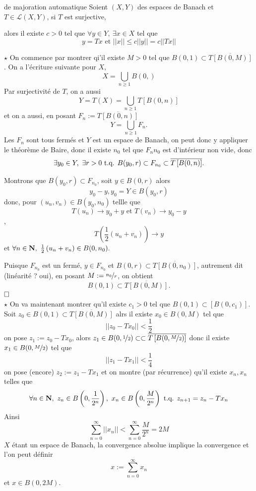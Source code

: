 \documentclass[a4paper,11pt, twoside]{article}
\begin{document}
\begin{thC}{de majoration automatique}
  Soient $(X,Y)$ des espaces de Banach et $T\in\mathcal L(X,Y)$, si $T$ est surjective,

  alors il existe $c>0$ tel que $\forall y\in Y,\ \exists x\in X$ tel que
  $$y=Tx\text{ et }||x||\leqslant c||y||=c||Tx||$$
\end{thC}


\begin{Proof}
  $\star$ On commence par montrer qi'il existe $M>0$ tel que $B(0,1)\subset \overline{T\left[B(0,M)\right]}$. On a l'écriture suivante pour $X$,
  $$X=\bigcup_{n\geqslant 1}B(0,)$$
  Par surjectivité de $T$, on a aussi
  $$Y=T(X)=\bigcup_{n\geqslant 1}T\left[B(0,n)\right]$$
  et on a aussi, en posant $F_n:=\overline{T\left[B(0,n)\right]}$
  $$Y=\bigcup_{n\geqslant 1}F_n.$$
  Les $F_n$ sont tous fermés et $Y$ est un espace de Banach, on peut donc y appliquer le théorème de Baire, donc il existe $n_0$ tel que $F_n{n_0}$ est d'intérieur non vide, donc
  $$\exists y_0\in Y,\ \exists r>0\text{ t.q. } B(y_0,r)\subset F_{n_0}\subset \overline{T\left[B(0,n)\right]}.$$

  Montrons que $B(y_0,r)\subset F_{n_0}$, soit $y\in B(0,r)$ alors 
  $$y_0-y,y_0=Y\in B(y_0,r)$$
  donc, pour $(u_n,v_n)\in B(y_0,n_0)$ tellle que 
  $$T(u_n)\longrightarrow y_0+y\text{ et }T(v_n)\longrightarrow y_0-y$$,
  $$T\left(\frac12\left(u_n+v_n\right)\right)\longrightarrow y$$
  et $\forall n\in\N,\ \frac12\left(u_n+v_n\right)\in B(0,n_0).$

  Puisque $F_{n_0}$ est un fermé, $y\in F_{n_0}$ et $B(0,r)\subset\overline{T\left[B(0,n_0)\right]}$, autrement dit (linéarité ? oui), en posant $M:=\nicefrac{n_0}{r}$, on obtient 
  $$B(0,1)\subset \overline{T\left[B(0,M)\right]}.$$
  $\hfill\square$\\

  $\star$ On va maintenant montrer qu'il existe $c_1>0$ tel que $B(0,1)\subset\left[B(0,c_1)\right].$ Soit $z_0\in B(0,1)\subset \overline{T\left[B(0,M)\right]}$ alrs il existe $x_0\in B(0,M)$ tel que
  $$||z_0-Tx_0||<\frac12$$
  on pose $z_1:=z_0-Tx_0$, alors $z_1\in B(0,\nicefrac12)\subset \subset \overline{T\left[B(0,\nicefrac{M}{2})\right]}$ donc il existe $x_1\in B(0,\nicefrac{M}{2})$ tel que 
  $$||z_1-Tx_1||<\frac14$$
  on pose (encore) $z_2:=z_1-Tx_1$ et on montre (par récurrence) qu'il existe $x_n,x_n$ telles que 
  $$\forall n\in \mathbf N,\ z_n\in B\left(0,\frac{1}{2^n}\right),\ x_n\in B\left(0,\frac{M}{2^n}\right)\text{ t.q. } z_{n+1}=z_n-Tx_n$$
  Ainsi 
  $$\sum_{n=0}^\infty ||x_n||<\sum_{n=0}^\infty\frac{M}{2^n}=2M$$
  $X$ étant un espace de Banach, la convergence absolue implique la convergence et l'on peut définir 
  $$x:=\sum_{n=0}^\infty x_n$$
  et $x\in B(0,2M)$.


\end{Proof}
\end{document}
